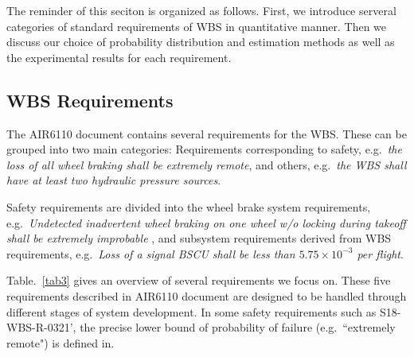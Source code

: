The reminder of this seciton is organized as follows. First, we introduce serveral categories of standard requirements of WBS in quantitative manner. Then we discuss our choice of probability distribution and estimation methods as well as the experimental results for each requirement.

\subsection{WBS Requirements}
The AIR6110 document contains several requirements for the WBS. These can be grouped into two main categories: Requirements corresponding to safety, e.g.\ \emph{the loss of all wheel braking shall be extremely remote}, and others, e.g.\ \emph{the WBS shall have at least two hydraulic pressure sources}.

Safety requirements are divided into the wheel brake system requirements, e.g.\ \emph{Undetected inadvertent wheel braking on one wheel w/o locking during takeoff shall be extremely improbable
}, and subsystem requirements derived from WBS requirements, e.g.\ \emph{Loss of a signal BSCU shall be less than $5.75\times10^{-3}$ per flight}.

Table.~\ref{tab3} gives an overview of several requirements we focus on. These five requirements described in AIR6110 document are designed to be handled through different stages of system development. In some safety requirements such as S18-WBS-R-0321', the precise lower bound of probability of failure (e.g.\ ``extremely remote") is defined in\cite{ac}.


